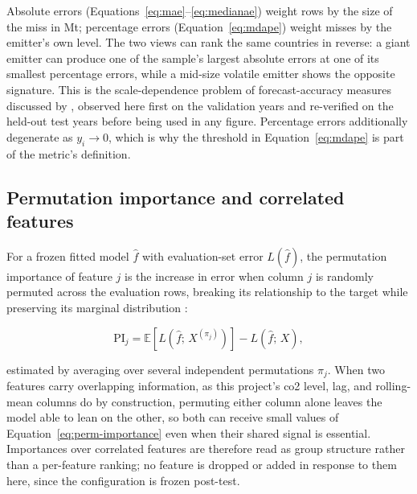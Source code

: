 Absolute errors (Equations~\ref{eq:mae}--\ref{eq:medianae}) weight rows by
the size of the miss in Mt; percentage errors (Equation~\ref{eq:mdape})
weight misses by the emitter's own level. The two views can rank the same
countries in reverse: a giant emitter can produce one of the sample's
largest absolute errors at one of its smallest percentage errors, while a
mid-size volatile emitter shows the opposite signature. This is the
scale-dependence problem of forecast-accuracy measures discussed by
\cite{hyndman2006another}, observed here first on the validation years and
re-verified on the held-out test years before being used in any figure.
Percentage errors additionally degenerate as $y_i \to 0$, which is why the
threshold in Equation~\ref{eq:mdape} is part of the metric's definition.

\subsection{Permutation importance and correlated features}

For a frozen fitted model $\hat f$ with evaluation-set error
$L(\hat f)$, the permutation importance of feature $j$ is the increase in
error when column $j$ is randomly permuted across the evaluation rows,
breaking its relationship to the target while preserving its marginal
distribution \cite{breiman2001random}:

\begin{equation}
\label{eq:perm-importance}
\mathrm{PI}_j = \mathbb{E}\!\left[ L\!\left(\hat f;\, X^{(\pi_j)}\right) \right] - L\!\left(\hat f;\, X\right),
\end{equation}

estimated by averaging over several independent permutations $\pi_j$. When
two features carry overlapping information, as this project's co2 level,
lag, and rolling-mean columns do by construction, permuting either column
alone leaves the model able to lean on the other, so both can receive small
values of Equation~\ref{eq:perm-importance} even when their shared signal
is essential. Importances over correlated features are therefore read as
group structure rather than a per-feature ranking; no feature is dropped or
added in response to them here, since the configuration is frozen
post-test.
